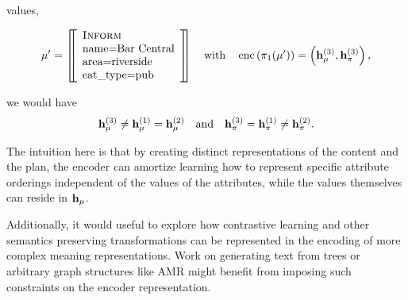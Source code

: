 values,\begin{singlespace}\[
    \mu^\prime = \left[\!\!\left[  \begin{array}{l} \textsc{Inform} \\ \textrm{name=Bar Central} \\ \textrm{area=riverside} \\ \textrm{eat\_type=pub} \end{array} \right]\!\!\right] \quad \textrm{with} \quad  \operatorname{enc}\left(\pi_1(\mu^\prime)\right) = \left(\mathbf{h}^{(3)}_{\mu}, \mathbf{h}^{(3)}_{\pi}\right),
\]\end{singlespace} 
we would have 
\[ \mathbf{h}^{(3)}_{\mu} \ne \mathbf{h}^{(1)}_{\mu} = \mathbf{h}^{(2)}_{\mu}\quad \textrm{and} \quad  \mathbf{h}^{(3)}_{\pi} = \mathbf{h}^{(1)}_{\pi} \ne  \mathbf{h}^{(2)}_{\pi}. \]

The intuition here is that by creating distinct representations of the content
and the plan, the encoder can amortize learning how to represent specific
attribute orderings independent of the values of the attributes, while the
values themselves can reside in $\mathbf{h}_{\mu}$.

Additionally, it would useful to explore how contrastive learning and other
semantics preserving transformations can be represented in the encoding of more
complex meaning representations. Work on generating text from  trees
\citep{balakrishnan2019} or arbitrary graph structures like  AMR
\citep{wang2020} might benefit from imposing such constraints on the encoder
representation.
